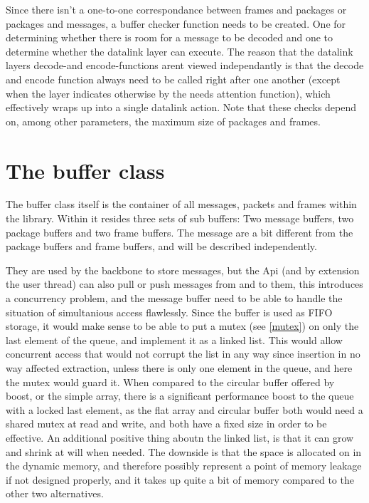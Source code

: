 Since there isn't a one-to-one correspondance between frames and packages or packages and messages, a buffer checker function needs to be created. One for determining whether there is room for a message to be decoded and one to determine whether the datalink layer can execute. The reason that the datalink layers decode-and encode-functions arent viewed independantly is that the decode and encode function always need to be called right after one another (except when the layer indicates otherwise by the needs attention function), which effectively wraps up into a single datalink action.
Note that these checks depend on, among other parameters, the maximum size of packages and frames.





\section{The buffer class}
The buffer class itself is the container of all messages, packets and frames within the library. Within it resides three sets of sub buffers: Two message buffers, two package buffers and two frame buffers. 
The message are a bit different from the package buffers and frame buffers, and will be described independently. 

They are used by the backbone to store messages, but the Api (and by extension the user thread) can also pull or push messages from and to them, this introduces a concurrency problem, and the message buffer need to be able to handle the situation of simultanious access flawlessly.
Since the buffer is used as FIFO storage, it would make sense to be able to put a mutex (see \ref{mutex}) on only the last element of the queue, and implement it as a linked list.
This would allow concurrent access that would not corrupt the list in any way since insertion in no way affected extraction, unless there is only one element in the queue, and here the mutex would guard it.
When compared to the circular buffer offered by boost, or the simple array, there is a significant performance boost to the queue with a locked last element, as the flat array and circular buffer both would need a shared mutex at read and write, and both have a fixed size in order to be effective.
An additional positive thing aboutn the linked list, is that it can grow and shrink at will when needed. The downside is that the space is allocated on in the dynamic memory, and therefore possibly represent a point of memory leakage if not designed properly, and it takes up quite a bit of memory compared to the other two alternatives.

